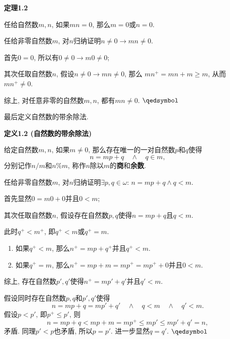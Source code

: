 \documentclass[UTF8]{ctexart}
\begin{document}
\newpage

\hypertarget{sec:定理1.2}{}
\noindent\textbf{定理1.2}

任给自然数$m,n$, 如果$mn=0$, 那么$m=0$或$n=0$.


任给非零自然数$m$, 对$n$归纳证明$n\neq 0\to mn\neq 0$.

首先$0=0$, 所以有$0\neq 0\to m0\neq 0$;

其次任取自然数$n$, 假设$n\neq 0\to mn\neq 0$, 那么
$mn^+=mn+m\geqslant m$, 从而$mn^+\neq 0$.

综上, 对任意非零的自然数$m,n$, 都有$mn\neq 0$. \hfill $\qedsymbol$

\vspace{10pt}

最后定义自然数的带余除法.

\vspace{10pt}

\hypertarget{sec:定义1.2}{}
\noindent\textbf{定义1.2 (自然数的带余除法)}

给定自然数$m,n$, 如果$m\neq 0$, 那么存在唯一的一对自然数$p$和$q$使得
\[
    n=mp+q\quad\land\quad q\in m,
\]
分别记作$n/m$和$n\%m$, 称作$n$除以$m$的\textbf{商}和\textbf{余数}.



任给非零自然数$m$, 对$n$归纳证明$\exists p,q\in\omega:\,n=mp+q\land q<m$.

首先显然$0=m0+0$并且$0<m$;

其次任取自然数$n$, 假设存在自然数$p,q$使得$n=mp+q$且$q<m$.

此时$q^+<m^+$, 即$q^+<m$或$q^+=m$.

\begin{enumerate}
    \item 如果$q^+<m$, 那么$n^+=mp+q^+$并且$q^+<m$.
    \item 如果$q^+=m$, 那么$n^+=mp+m=mp^+=mp^++0$并且$0<m$.
\end{enumerate}
综上, 存在自然数$p',q'$使得$n^+=mp'+q'$并且$q'<m$.


假设同时存在自然数$p,q$和$p',q'$使得
\[
    n=mp+q=mp'+q'\quad\land\quad q<m\quad\land\quad q'<m.
\]
假设$p<p'$, 即$p^+\leqslant p'$, 则
\[
    n=mp+q<mp+m=mp^+\leqslant mp'\leqslant mp'+q'=n,
\]
矛盾. 同理$p'<p$也矛盾, 所以$p=p'$. 进一步显然$q=q'$. \hfill $\qedsymbol$
\end{document}
